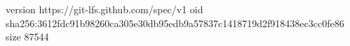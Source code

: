 version https://git-lfs.github.com/spec/v1
oid sha256:3612fdc91b98260ca305e30db95edb9a57837c1418719d2f918438ec3cc0fe86
size 87544
